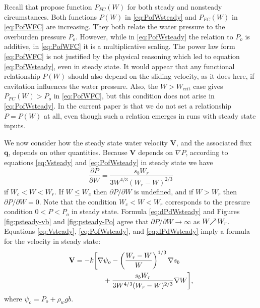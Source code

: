 \documentclass[gmd]{copernicus}   %
\newcommand{\text}{\textrm}
\newcommand\bV{\mathbf{V}}
\newcommand\bq{\mathbf{q}}
\newcommand{\grad}{\nabla}
\begin{document}
Recall that \cite{FlowersClarke2002_theory} propose function $P_{FC}(W)$ for both steady and nonsteady circumstances.  Both functions $P(W)$ in \eqref{eq:PofWsteady} and $P_{FC}(W)$ in \eqref{eq:PofWFC} are increasing.  They both relate the water pressure to the overburden pressure $P_o$.  However, while in \eqref{eq:PofWsteady} the relation to $P_o$ is additive, in \eqref{eq:PofWFC} it is a multiplicative scaling.  The power law form \eqref{eq:PofWFC} is not justified by the physical reasoning which led to equation \eqref{eq:PofWsteady}, even in steady state.   It would appear that any functional relationship $P(W)$ should also depend on the sliding velocity, as it does here, if cavitation influences the water pressure.  Also, the $W>W_{\text{crit}}$ case gives $P_{FC}(W) > P_o$ in \eqref{eq:PofWFC}, but this condition does not arise in \eqref{eq:PofWsteady}.  In the current paper is that we do not set a relationship $P=P(W)$ at all, even though such a relation emerges in runs with steady state inputs.

We now consider how the steady state water velocity $\bV$, and the associated flux $\bq$, depends on other quantities.  Because $\bV$ depends on $\grad P$, according to equations \eqref{eq:Vsteady} and \eqref{eq:PofWsteady} in steady state we have
\begin{equation}
\frac{\partial P}{\partial W} = \frac{s_b W_r}{3 W^{4/3} (W_r - W)^{2/3}} \label{eq:dPdWsteady}
\end{equation}
if $W_c < W < W_r$.  If $W\le W_c$ then $\partial P/\partial W$ is undefined, and if $W>W_r$ then $\partial P/\partial W=0$.  Note that the condition $W_c < W < W_r$ corresponds to the pressure condition $0 < P < P_o$ in steady state.  Formula \eqref{eq:dPdWsteady} and Figures \ref{fig:psteady-vb} and \ref{fig:psteady-Po} agree that $\partial P / \partial W \to \infty$ as $W \!\!\nearrow\! W_r$.  Equations \eqref{eq:Vsteady}, \eqref{eq:PofWsteady}, and \eqref{eq:dPdWsteady} imply a formula for the velocity in steady state:
\begin{align}
\bV &= - k \bigg[\grad \psi_o - \left(\frac{W_r - W}{W}\right)^{1/3} \grad s_b \label{eq:Vsteadyexpand} \\
    & \qquad \qquad + \frac{s_b W_r}{3 W^{4/3} (W_r - W)^{2/3}} \grad W\bigg], \notag
\end{align}
where $\psi_o = P_o + \rho_w g b$.
\end{document}
